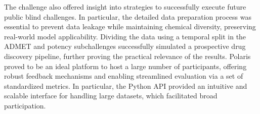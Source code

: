 \documentclass[journal=jcim,manuscript=article]{achemso}
\begin{document}
The challenge also offered insight into strategies to successfully execute future public blind challenges. In particular, the detailed data preparation process was essential to prevent data leakage while maintaining chemical diversity, preserving real-world model applicability. Dividing the data using a temporal split in the ADMET and potency subchallenges successfully simulated a prospective drug discovery pipeline, further proving the practical relevance of the results.
Polaris proved to be an ideal platform to host a large number of participants, offering robust feedback mechanisms and enabling streamlined evaluation via a set of standardized metrics. In particular, the Python API provided an intuitive and scalable interface for handling large datasets, which facilitated broad participation. 
\end{document}
